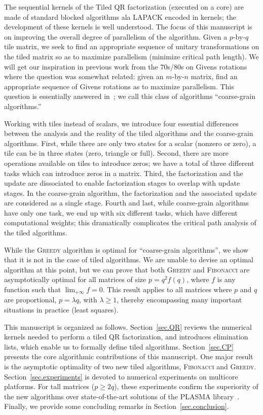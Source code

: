 \documentclass[a4paper,twopages]{article}
\newcommand{\MC}{\textsc{Fibonacci}\xspace}
\newcommand{\Greedy}{\textsc{Greedy}\xspace}
\begin{document}
The sequential kernels of the Tiled QR factorization (executed on a core) are
made of standard blocked algorithms ala LAPACK encoded in kernels; the
development of these kernels is well understood. The focus of this manuscript is on
improving the overall degree of parallelism of the algorithm.  Given a
$p$-by-$q$ tile matrix, we seek to find an appropriate sequence of unitary
transformations on the tiled matrix so as to maximize parallelism (minimize
critical path length). We will get our inspiration in previous work from the
70s/80s on Givens rotations where the question was somewhat related: given an
$m$-by-$n$ matrix, find an appropriate sequence of Givens rotations as to
maximize parallelism. This question is essentially answered
in~\cite{j12,j14,ModiClarke84,SamehKuck78}; we call this class of
algorithms ``coarse-grain algorithms.''

Working with tiles instead of scalars, we introduce four essential differences
between the analysis and the reality of the tiled algorithms and the
coarse-grain algorithms.  First, while there are only two states for a scalar
(nonzero or zero), a tile can be in three states (zero, triangle or full).
Second, there are more operations available on tiles to introduce zeros; we have
a total of three different tasks which can introduce zeros in a matrix.  Third,
the factorization and the update are dissociated to enable factorization stages
to overlap with update stages. In the coarse-grain algorithm, the factorization and the
associated update are considered as a single stage. Fourth and last, while
coarse-grain algorithms have only one task, we end up with six different tasks,
which have different computational weights; this dramatically complicates the critical path analysis of
the tiled algorithms.


While the \Greedy algorithm is optimal for ``coarse-grain algorithms'', we show
that it is not in the case of tiled algorithms. We are unable to devise an
optimal algorithm at this point, but we can prove that both \Greedy and \MC are
asymptotically optimal for all matrices of size $p = q^2 f(q)$, where $f$ is
any function such that $\lim_{+\infty} f= 0$. This result applies to all
matrices where $p$ and $q$ are proportional, $ p = \lambda q$, with $\lambda
\geq 1$, thereby encompassing many important situations in practice (least
squares).

This manuscript is organized as follows. Section~\ref{sec.QR} reviews the numerical
kernels needed to perform a tiled QR factorization, and introduces elimination lists,
which enable us to formally define tiled algorithms. Section~\ref{sec.CP} presents the core
algorithmic contributions of this manuscript. One major result is the asymptotic optimality of two new tiled algorithms, \MC and \Greedy.
Section~\ref{sec.experiments} is devoted to numerical experiments on
multicore platforms. For tall matrices ($p \geq 2q$), these experiments confirm the superiority
of the new algorithms over state-of-the-art solutions of the PLASMA library~\cite{Buttari2008,tileplasma,CAQR,Hadri_ipdps_2010}.
Finally, we provide some concluding remarks in Section~\ref{sec.conclusion}.
\end{document}
